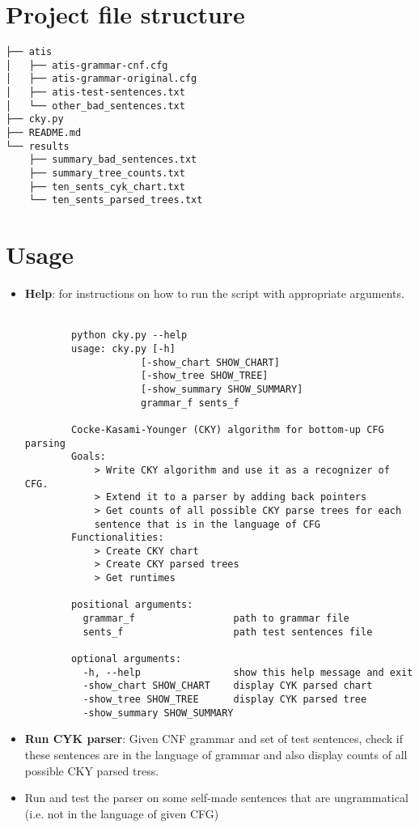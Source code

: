 \documentclass{article}[a4paper]
\begin{document}
\section{Project file structure}
\begin{Verbatim}
├── atis
│   ├── atis-grammar-cnf.cfg
│   ├── atis-grammar-original.cfg
│   ├── atis-test-sentences.txt
│   └── other_bad_sentences.txt
├── cky.py
├── README.md
└── results
    ├── summary_bad_sentences.txt
    ├── summary_tree_counts.txt
    ├── ten_sents_cyk_chart.txt
    └── ten_sents_parsed_trees.txt
 \end{Verbatim}

\section{Usage}
\begin{itemize}
    \item \textbf{Help}: for instructions on how to run the script with appropriate arguments.\\
        \\
        \begin{lstlisting}
        python cky.py --help
        usage: cky.py [-h] 
                    [-show_chart SHOW_CHART] 
                    [-show_tree SHOW_TREE]
                    [-show_summary SHOW_SUMMARY]
                    grammar_f sents_f
        
        Cocke-Kasami-Younger (CKY) algorithm for bottom-up CFG parsing 
        Goals: 
            > Write CKY algorithm and use it as a recognizer of CFG. 
            > Extend it to a parser by adding back pointers 
            > Get counts of all possible CKY parse trees for each 
            sentence that is in the language of CFG 
        Functionalities: 
            > Create CKY chart
            > Create CKY parsed trees 
            > Get runtimes
        
        positional arguments:
          grammar_f                 path to grammar file
          sents_f                   path test sentences file
        
        optional arguments:
          -h, --help                show this help message and exit
          -show_chart SHOW_CHART    display CYK parsed chart
          -show_tree SHOW_TREE      display CYK parsed tree
          -show_summary SHOW_SUMMARY
        \end{lstlisting}


        \item \textbf{Run CYK parser}: Given CNF grammar and set of test sentences, check if these sentences are in the language of grammar and also display counts of all possible CKY parsed tress.\\
  
        \item Run and test the parser on some self-made sentences that are ungrammatical (i.e. not in the language of given CFG) \\
 
\end{itemize}
\end{document}
